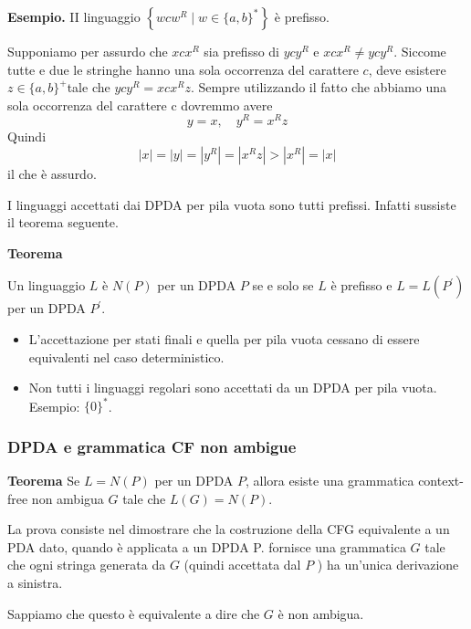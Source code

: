 \textbf{Esempio.} II linguaggio $\left\{w c w^{R} \mid w \in\{a, b\}^{*}\right\}$ è prefisso. 

Supponiamo per assurdo che $x c x^{R}$ sia prefisso di $y c y^{R}$ e $x c x^{R} \neq y c y^{R} .$
Siccome tutte e due le stringhe hanno una sola occorrenza del carattere $c$, deve esistere $z \in\{a, b\}^{+}$tale che $y c y^{R}=x c x^{R} z$. Sempre utilizzando il fatto che abbiamo una sola occorrenza del carattere c dovremmo avere
$$
y=x, \quad y^{R}=x^{R} z
$$
Quindi
$$
|x|=|y|=\left|y^{R}\right|=\left|x^{R} z\right|>\left|x^{R}\right|=|x|
$$
il che è assurdo.

\vspace{5mm}

I linguaggi accettati dai DPDA per pila vuota sono tutti prefissi. Infatti sussiste il teorema seguente.

\vspace{5mm}

\textbf{Teorema}

Un linguaggio $L$ è $N(P)$ per un DPDA $P$ se e solo se $L$ è prefisso e $L=L\left(P^{\prime}\right)$ per un DPDA $P^{\prime}$.
\begin{itemize}
    \item  L'accettazione per stati finali e quella per pila vuota cessano di essere equivalenti nel caso deterministico.
    \item Non tutti i linguaggi regolari sono accettati da un DPDA per pila vuota.
Esempio: $\{0\}^{*}$.
\end{itemize}

\subsubsection{DPDA e grammatica CF non ambigue}

\textbf{Teorema}
Se $L=N(P)$ per un DPDA $P$, allora esiste una grammatica context-free non ambigua $G$ tale che $L(G)=N(P)$.

\vspace{5mm}

La prova consiste nel dimostrare che la costruzione della CFG equivalente a un PDA dato, quando è applicata a un DPDA P. fornisce una grammatica $G$ tale che ogni stringa generata da $G$ (quindi accettata dal $P$ ) ha un'unica derivazione a sinistra.

Sappiamo che questo è equivalente a dire che $G$ è non ambigua.

\vspace{5mm}

